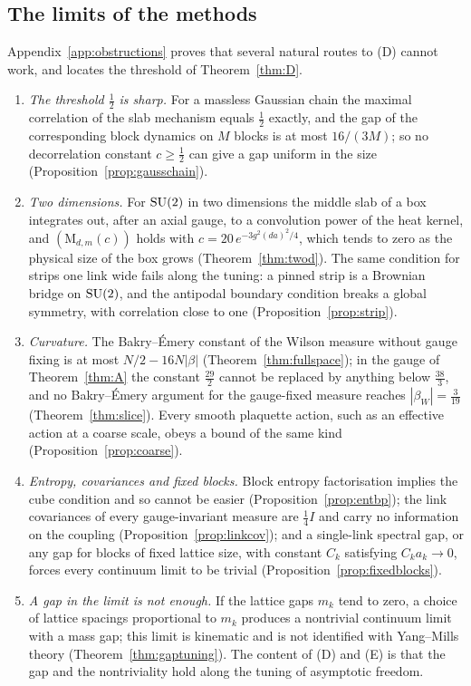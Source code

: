 \subsection{The limits of the methods}

Appendix~\ref{app:obstructions} proves that several natural routes to (D)
cannot work, and locates the threshold of Theorem~\ref{thm:D}.
\begin{enumerate}[label=\textup{(\alph*)},leftmargin=*]
\item \emph{The threshold $\frac12$ is sharp.} For a massless Gaussian chain
the maximal correlation of the slab mechanism equals $\frac12$ exactly, and
the gap of the corresponding block dynamics on $M$ blocks is at most
$16/(3M)$; so no decorrelation constant $c\ge\frac12$ can give a gap uniform in
the size (Proposition~\ref{prop:gausschain}).
\item \emph{Two dimensions.} For $\mathrm{SU}(2)$ in two dimensions the middle slab of
a box integrates out, after an axial gauge, to a convolution power of the
heat kernel, and $(\mathrm M_{d,m}(c))$ holds with
$c=20\,e^{-3g^2(da)^2/4}$, which tends to zero as the physical size of the box
grows (Theorem~\ref{thm:twod}). The same condition for strips one link wide
fails along the tuning: a pinned strip is a Brownian bridge on $\mathrm{SU}(2)$, and
the antipodal boundary condition breaks a global symmetry, with correlation
close to one (Proposition~\ref{prop:strip}).
\item \emph{Curvature.} The Bakry--\'Emery constant of the Wilson measure
without gauge fixing is at most $N/2-16N|\beta|$ (Theorem~\ref{thm:fullspace});
in the gauge of
Theorem~\ref{thm:A} the constant $\frac{29}2$ cannot be replaced by anything
below $\frac{38}3$, and no Bakry--\'Emery argument for the gauge-fixed measure
reaches $|\beta_W|=\frac3{19}$ (Theorem~\ref{thm:slice}). Every smooth
plaquette action, such as an effective action at a coarse scale, obeys a bound
of the same kind (Proposition~\ref{prop:coarse}).
\item \emph{Entropy, covariances and fixed blocks.} Block entropy
factorisation implies the cube condition and so cannot be easier
(Proposition~\ref{prop:entbp}); the link covariances of every gauge-invariant
measure are $\frac14I$ and carry no information on the coupling
(Proposition~\ref{prop:linkcov}); and a single-link spectral gap, or any gap
for blocks of fixed lattice size, with constant $C_k$ satisfying $C_ka_k\to0$,
forces every continuum limit to be trivial
(Proposition~\ref{prop:fixedblocks}).
\item \emph{A gap in the limit is not enough.} If the lattice gaps $m_k$ tend
to zero, a choice of lattice spacings proportional to $m_k$ produces a
nontrivial continuum limit with a mass gap; this limit is kinematic and is not
identified with Yang--Mills theory (Theorem~\ref{thm:gaptuning}). The content
of (D) and (E) is that the gap and the nontriviality hold along the tuning of
asymptotic freedom.
\end{enumerate}

